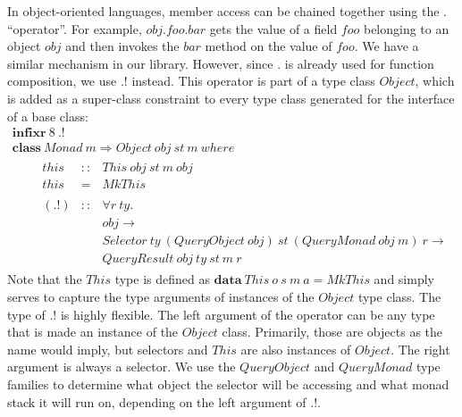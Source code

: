 In object-oriented languages, member access can be chained together using the $.$ ``operator''. For example, $\mathit{obj}.\mathit{foo}.\mathit{bar}$ gets the value of a field $\mathit{foo}$ belonging to an object $\mathit{obj}$ and then invokes the $\mathit{bar}$ method on the value of $\mathit{foo}$. We have a similar mechanism in our library. However, since $.$ is already used for function composition, we use $.!$ instead. This operator is part of a type class $\mathit{Object}$, which is added as a super-class constraint to every type class generated for the interface of a base class:
\begin{displaymath}
\begin{array}{l}
\mathbf{infixr}~8~.!\\
\mathbf{class}~\mathit{Monad}~m \Rightarrow \mathit{Object}~\mathit{obj}~\mathit{st}~m~\mathit{where} \\
\qquad \begin{array}{lcl}
\mathit{this} & :: & \mathit{This}~\mathit{obj}~\mathit{st}~\mathit{m}~\mathit{obj} \\
\mathit{this} & = & \mathit{MkThis} \\\\

(.!) & :: & \forall r~\mathit{ty}.\\ 
     &    & \mathit{obj} \to \\
     &    & \mathit{Selector}~\mathit{ty}~(\mathit{QueryObject}~\mathit{obj})~\mathit{st}~(\mathit{QueryMonad}~\mathit{obj}~\mathit{m})~r \to  \\
     &    & \mathit{QueryResult}~\mathit{obj}~\mathit{ty}~\mathit{st}~m~r
\end{array}
\end{array}
\end{displaymath}
Note that the $\mathit{This}$ type is defined as $\mathbf{data}~\mathit{This}~o~s~m~a = \mathit{MkThis}$ and simply serves to capture the type arguments of instances of the $\mathit{Object}$ type class. The type of $.!$ is highly flexible. The left argument of the operator can be any type that is made an instance of the $\mathit{Object}$ class. Primarily, those are objects as the name would imply, but selectors and $\mathit{This}$ are also instances of $\mathit{Object}$. The right argument is always a selector. We use the $\mathit{QueryObject}$ and $\mathit{QueryMonad}$ type families to determine what object the selector will be accessing and what monad stack it will run on, depending on the left argument of $.!$.

